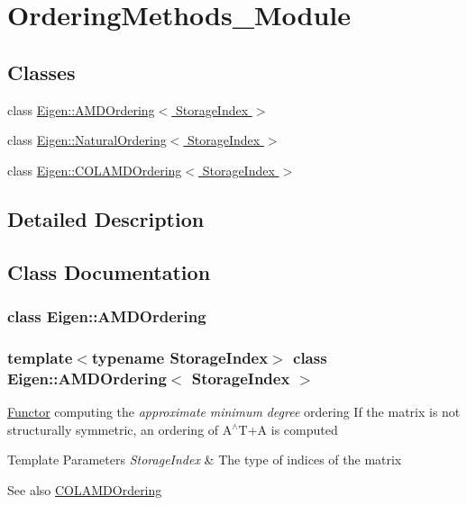 \hypertarget{group___ordering_methods___module}{}\section{Ordering\+Methods\+\_\+\+Module}
\label{group___ordering_methods___module}
\subsection*{Classes}
\begin{DoxyCompactItemize}
\item 
class \hyperlink{group___ordering_methods___module_class_eigen_1_1_a_m_d_ordering}{Eigen\+::\+A\+M\+D\+Ordering$<$ Storage\+Index $>$}
\item 
class \hyperlink{group___ordering_methods___module_class_eigen_1_1_natural_ordering}{Eigen\+::\+Natural\+Ordering$<$ Storage\+Index $>$}
\item 
class \hyperlink{group___ordering_methods___module_class_eigen_1_1_c_o_l_a_m_d_ordering}{Eigen\+::\+C\+O\+L\+A\+M\+D\+Ordering$<$ Storage\+Index $>$}
\end{DoxyCompactItemize}


\subsection{Detailed Description}


\subsection{Class Documentation}
\label{class_eigen_1_1_a_m_d_ordering}
\subsubsection{class Eigen\+:\+:A\+M\+D\+Ordering}
\subsubsection*{template$<$typename Storage\+Index$>$\newline
class Eigen\+::\+A\+M\+D\+Ordering$<$ Storage\+Index $>$}

\hyperlink{struct_functor}{Functor} computing the {\itshape approximate} {\itshape minimum} {\itshape degree} ordering If the matrix is not structurally symmetric, an ordering of A$^\wedge$\+T+A is computed 
\begin{DoxyTemplParams}{Template Parameters}
{\em Storage\+Index} & The type of indices of the matrix \\
\hline
\end{DoxyTemplParams}
\begin{DoxySeeAlso}{See also}
\hyperlink{group___ordering_methods___module_class_eigen_1_1_c_o_l_a_m_d_ordering}{C\+O\+L\+A\+M\+D\+Ordering} 
\end{DoxySeeAlso}


